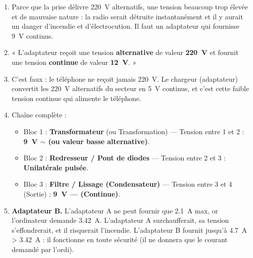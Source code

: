 \documentclass[11pt]{article}
\begin{document}
\begin{corrige}
\begin{enumerate}
\item Parce que la prise délivre \SI{220}{V} alternatifs, une tension beaucoup trop élevée et de mauvaise nature : la radio serait détruite instantanément et il y aurait un danger d'incendie et d'électrocution. Il faut un adaptateur qui fournisse \SI{9}{V} continus.
\item « L'adaptateur reçoit une tension \textbf{alternative} de valeur \textbf{\SI{220}{V}} et fournit une tension \textbf{continue} de valeur \textbf{\SI{12}{V}}. »
\item C'est faux : le téléphone ne reçoit jamais \SI{220}{V}. Le chargeur (adaptateur) convertit les \SI{220}{V} alternatifs du secteur en \SI{5}{V} continus, et c'est cette faible tension continue qui alimente le téléphone.
\item Chaîne complète :
\begin{itemize}
\item Bloc 1 : \textbf{Transformateur} (ou Transformation) — Tension entre 1 et 2 : \textbf{\SI{9}{V} $\sim$ (ou valeur basse alternative)}.
\item Bloc 2 : \textbf{Redresseur / Pont de diodes} — Tension entre 2 et 3 : \textbf{Unilatérale pulsée}.
\item Bloc 3 : \textbf{Filtre / Lissage (Condensateur)} — Tension entre 3 et 4 (Sortie) : \textbf{\SI{9}{V} --- (Continue)}.
\end{itemize}
\item \textbf{Adaptateur B.} L'adaptateur A ne peut fournir que \SI{2,1}{A} max, or l'ordinateur demande \SI{3,42}{A}. L'adaptateur A surchaufferait, sa tension s'effondrerait, et il risquerait l'incendie. L'adaptateur B fournit jusqu'à \SI{4,7}{A} > \SI{3,42}{A} : il fonctionne en toute sécurité (il ne donnera que le courant demandé par l'ordi).
\end{enumerate}
\end{corrige}
\end{document}
